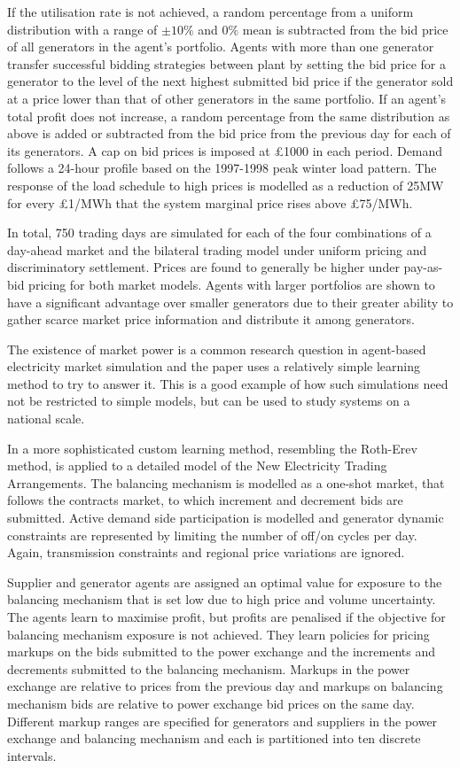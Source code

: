 If the utilisation rate is not achieved, a random percentage from a uniform
distribution with a range of $\pm10\%$ and $0\%$ mean is subtracted from the bid
price of all generators in the agent's portfolio.  Agents with more than one
generator transfer successful bidding strategies between plant by setting the
bid price for a generator to the level of the next highest submitted bid price
if the generator sold at a price lower than that of other generators in the same
portfolio.  If an agent's total profit does not increase, a random percentage
from the same distribution as above is added or subtracted from the bid price
from the previous day for each of its generators.  A cap on bid prices is
imposed at \pounds1000 in each period.  Demand follows a 24-hour profile based
on the 1997-1998 peak winter load pattern.  The response of the load schedule to
high prices is modelled as a reduction of 25MW for every \pounds1/MWh that the
system marginal price rises above \pounds75/MWh.

In total, 750 trading days are simulated for each of the four combinations of a
day-ahead market and the bilateral trading model under uniform pricing and
discriminatory settlement.  Prices are found to generally be higher under
pay-as-bid pricing for both market models.  Agents with larger portfolios are
shown to have a significant advantage over smaller generators due to their
greater ability to gather scarce market price information and distribute it
among generators.

The existence of market power is a common research question in agent-based
electricity market simulation and the paper uses a relatively simple learning
method to try to answer it.  This is a good example of how such simulations
need not be restricted to simple models, but can be used to study systems on
a national scale.

In  a more sophisticated custom learning method, resembling
the Roth-Erev method, is applied to a detailed model of the New Electricity
Trading Arrangements.  The balancing mechanism is modelled as a one-shot market,
that follows the contracts market, to which increment and decrement bids are
submitted.  Active demand side participation is modelled and generator dynamic
constraints are represented by limiting the number of off/on cycles per day.
Again, transmission constraints and regional price variations are ignored.

Supplier and generator agents are assigned an optimal value for
exposure to the balancing mechanism that is set low due to high price and
volume uncertainty.  The agents learn to maximise profit, but profits are
penalised if the objective for balancing mechanism exposure is not
achieved.  They learn policies for pricing markups on the bids submitted
to the power exchange and the increments and decrements submitted to the
balancing mechanism.  Markups in the power exchange are relative to prices
from the previous day and markups on balancing mechanism bids are relative to
power exchange bid prices on the same day.  Different markup
ranges are specified for generators and suppliers in the power exchange and
balancing mechanism and each is partitioned into ten discrete intervals.

